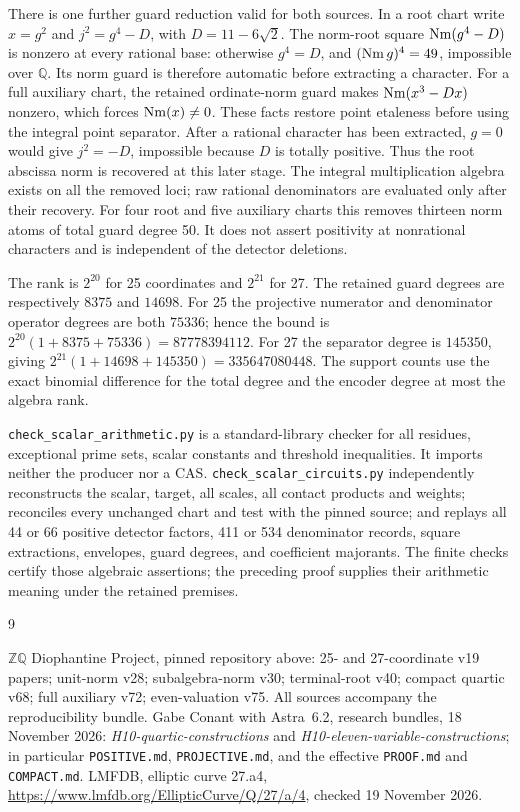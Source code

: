 \documentclass[11pt]{article}
\newcommand{\Q}{\mathbb Q}\newcommand{\Z}{\mathbb Z}
\begin{document}
There is one further guard reduction valid for both sources. In a root
chart write $x=g^2$ and $j^2=g^4-D$, with $D=11-6\sqrt2$.
The norm-root square $\operatorname{Nm}(g^4-D)$ is nonzero at every rational base:
otherwise $g^4=D$, and $(\operatorname{Nm} g)^4=49$, impossible over $\Q$.
Its norm guard is therefore automatic before extracting a character.
For a full auxiliary chart, the retained ordinate-norm guard makes
$\operatorname{Nm}(x^3-Dx)$ nonzero, which forces $\operatorname{Nm}(x)\ne0$.
These facts restore point etaleness before using the integral point
separator. After a rational character has been extracted, $g=0$ would
give $j^2=-D$, impossible because $D$ is totally positive.
Thus the root abscissa norm is recovered at this later stage.
The integral multiplication algebra exists on all the removed loci;
raw rational denominators are evaluated only after their recovery.
For four root and five auxiliary charts this removes thirteen norm
atoms of total guard degree 50. It does not assert positivity at
nonrational characters and is independent of the detector deletions.

The rank is $2^{20}$ for 25 coordinates and $2^{21}$ for 27.
The retained guard degrees are respectively $8375$ and $14698$.
For 25 the projective numerator and denominator operator degrees are
both $75336$; hence the bound is
$2^{20}(1+8375+75336)=87778394112$.
For 27 the separator degree is $145350$, giving
$2^{21}(1+14698+145350)=335647080448$.
The support counts use the exact binomial difference for the total
degree and the encoder degree at most the algebra rank.

\texttt{check\_scalar\_arithmetic.py} is a standard-library checker
for all residues, exceptional prime sets, scalar constants and threshold
inequalities. It imports neither the producer nor a CAS.
\texttt{check\_scalar\_circuits.py} independently reconstructs the
scalar, target, all scales, all contact products and weights; reconciles
every unchanged chart and test with the pinned source; and replays all
44 or 66 positive detector factors, 411 or 534 denominator records,
square extractions, envelopes, guard degrees, and coefficient majorants.
The finite checks certify those algebraic assertions; the preceding
proof supplies their arithmetic meaning under the retained premises.

\begin{thebibliography}{9}\raggedright
{} \(\Z\Q\) Diophantine Project, pinned repository above:
25- and 27-coordinate v19 papers; unit-norm v28; subalgebra-norm v30;
terminal-root v40; compact quartic v68; full auxiliary v72;
even-valuation v75. All sources accompany the reproducibility bundle.
 Gabe Conant with Astra~6.2, research bundles, 18 November 2026:
\emph{H10-quartic-constructions} and \emph{H10-eleven-variable-constructions};
in particular \texttt{POSITIVE.md}, \texttt{PROJECTIVE.md}, and the
effective \texttt{PROOF.md} and \texttt{COMPACT.md}.
 LMFDB, elliptic curve 27.a4,
\url{https://www.lmfdb.org/EllipticCurve/Q/27/a/4}, checked 19 November 2026.
\end{thebibliography}
\end{document}
